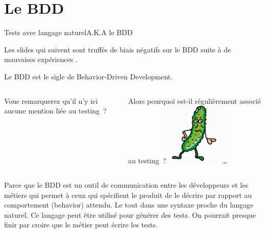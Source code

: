 \documentclass{beamer}
\begin{document}
    \section{Le BDD}\label{sec:le-bdd}
    \begin{frame}{Tests avec langage naturel}{A.K.A le BDD}
        \transdissolve

        \begin{dangercolorbox}
            Les slides qui suivent sont truffés de biais négatifs sur le BDD suite à de mauvaises expériences .

        \end{dangercolorbox}
        Le BDD est le sigle de Behavior-Driven Development.
        \begin{columns}
            Vous remarquerez qu'il n'y ici aucune mention liée au testing~?

            Alors pourquoi est-il régulièrement associé au testing~?
            \centering
            \includegraphics[width=3cm]{image/funny-drawing-of-a-cucumber}
        \end{columns}
        Parce que le BDD est un outil de communication entre les développeurs et les métiers qui permet à ceux qui spécifient le produit de le décrire par rapport au comportement (behavior) attendu.
        Le tout dans une syntaxe proche du langage naturel.
        Ce langage peut être utilisé pour générer des tests.
        On pourrait presque finir par croire que le métier peut écrire les tests.
    \end{frame}
\end{document}

